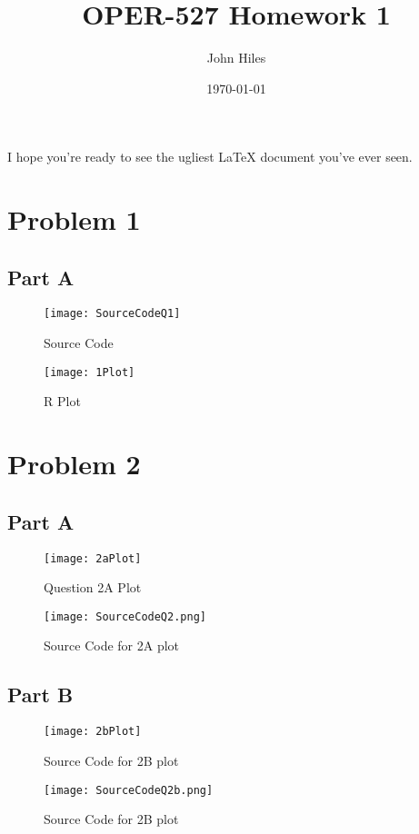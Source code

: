 \documentclass{article}
\title{OPER-527 Homework 1}
\author{John Hiles}
\date\today
\numberwithin{equation}{section}
\begin{document}
\maketitle %


I hope you're ready to see the ugliest LaTeX document you've ever seen.

\section{Problem 1}
\subsection{Part A}
\begin{figure}[hbt!]
\centering
\texttt{[image: SourceCodeQ1]}
\caption{Source Code}
\end{figure}
\begin{figure}[hbt!]
\centering
\texttt{[image: 1Plot]}
\caption{R Plot}
\end{figure}
\clearpage %


\section{Problem 2}
\subsection{Part A}
\begin{figure}[hbt!]
\centering
\texttt{[image: 2aPlot]}
\caption{Question 2A Plot}
\end{figure}
\begin{figure}[hbt!]
\centering
\texttt{[image: SourceCodeQ2.png]}
\caption{Source Code for 2A plot}
\end{figure}
\subsection{Part B}
\begin{figure}[hbt!]
\centering
\texttt{[image: 2bPlot]}
\caption{Source Code for 2B plot}
\end{figure}
\begin{figure}[hbt!]
\centering
\texttt{[image: SourceCodeQ2b.png]}
\caption{Source Code for 2B plot}
\end{figure}
\end{document}
